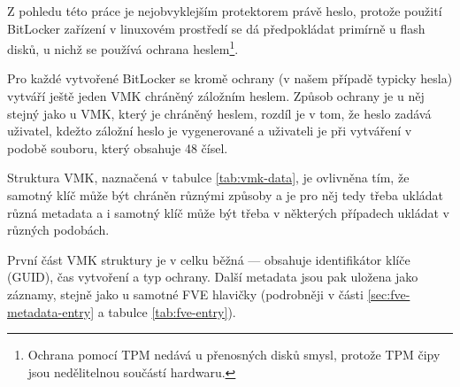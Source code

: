 
Z pohledu této práce je nejobvyklejším protektorem právě heslo, protože použití BitLocker zařízení v linuxovém prostředí se dá předpokládat primírně u flash disků, u nichž se používá ochrana heslem\footnote{Ochrana pomocí TPM nedává u přenosných disků smysl, protože TPM čipy jsou nedělitelnou součástí hardwaru.}.

Pro každé vytvořené BitLocker se kromě  ochrany (v našem případě typicky hesla) vytváří ještě jeden VMK chráněný záložním heslem. Způsob ochrany je u něj stejný jako u VMK, který je chráněný heslem, rozdíl je v tom, že heslo zadává uživatel, kdežto záložní heslo je vygenerované a uživateli je při vytváření  v podobě souboru, který obsahuje 48 čísel. 

Struktura VMK, naznačená v tabulce \ref{tab:vmk-data}, je ovlivněna tím, že samotný klíč může být chráněn různými způsoby a je pro něj tedy třeba ukládat různá metadata a i samotný klíč může být třeba v některých případech ukládat v různých podobách.

První část VMK struktury je v celku běžná --- obsahuje identifikátor klíče (GUID), čas vytvoření a typ ochrany. Další metadata jsou pak uložena jako záznamy, stejně jako u samotné FVE hlavičky (podrobněji v části \ref{sec:fve-metadata-entry} a tabulce \ref{tab:fve-entry}).


